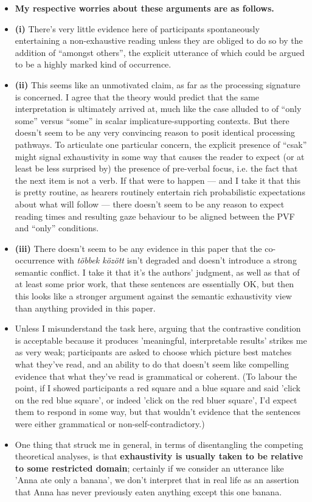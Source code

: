 \documentclass[a4paper, ruler]{CUP-JNL-LIN}%
\begin{document}
\begin{itemize}
  \item \textbf{My respective worries about these arguments are as follows.}
  \item \textbf{(i)} There's very little evidence here of participants spontaneously entertaining a non-exhaustive reading unless they are obliged to do so by the addition of ``amongst others'', the explicit utterance of which could be argued to be a highly marked kind of occurrence.
  \item \textbf{(ii)} This seems like an unmotivated claim, as far as the processing signature is concerned. I agree that the theory would predict that the same interpretation is ultimately arrived at, much like the case alluded to of ``only some'' versus ``some'' in scalar implicature-supporting contexts. But there doesn't seem to be any very convincing reason to posit identical processing pathways. To articulate one particular concern, the explicit presence of ``csak'' might signal exhaustivity in some way that causes the reader to expect (or at least be less surprised by) the presence of pre-verbal focus, i.e. the fact that the next item is not a verb. If that were to happen — and I take it that this is pretty routine, as hearers routinely entertain rich probabilistic expectations about what will follow — there doesn't seem to be any reason to expect reading times and resulting gaze behaviour to be aligned between the PVF and ``only'' conditions.
\end{itemize}


\begin{itemize}
  \item \textbf{(iii)} There doesn't seem to be any evidence in this paper that the co-occurrence with \emph{többek között} isn't degraded and doesn't introduce a strong semantic conflict. I take it that it's the authors' judgment, as well as that of at least some prior work, that these sentences are essentially OK, but then this looks like a stronger argument against the semantic exhaustivity view than anything provided in this paper.
  \item Unless I misunderstand the task here, arguing that the contrastive condition is acceptable because it produces 'meaningful, interpretable results' strikes me as very weak; participants are asked to choose which picture best matches what they've read, and an ability to do that doesn't seem like compelling evidence that what they've read is grammatical or coherent. (To labour the point, if I showed participants a red square and a blue square and said 'click on the red blue square', or indeed 'click on the red bluer square', I'd expect them to respond in some way, but that wouldn't evidence that the sentences were either grammatical or non-self-contradictory.)
  \item One thing that struck me in general, in terms of disentangling the competing theoretical analyses, is that \textbf{exhaustivity is usually taken to be relative to some restricted domain}; certainly if we consider an utterance like 'Anna ate only a banana', we don't interpret that in real life as an assertion that Anna has never previously eaten anything except this one banana.
\end{itemize}
\end{document}
